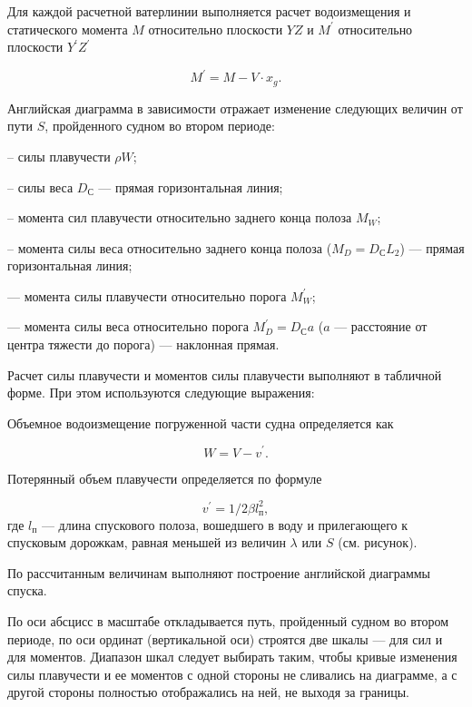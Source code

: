Для каждой расчетной ватерлинии выполняется расчет водоизмещения и статического момента $M$ относительно плоскости $YZ$ и $M^\prime$ относительно плоскости $Y^\prime Z^\prime$

\begin{equation}
    M^\prime = M - V \cdot x_g.
\end{equation}

Английская диаграмма в зависимости отражает изменение следующих величин от пути $S$, пройденного судном во втором периоде:

-- силы плавучести $\rho W$;

-- силы веса $D_{\text{С}}$ --- прямая горизонтальная линия;

-- момента сил плавучести относительно заднего конца полоза $M_W$;

-- момента силы веса относительно заднего конца полоза ($M_D = D_{\text{С}} L_2$) --- прямая горизонтальная линия;

--- момента силы плавучести относительно порога $M_W^\prime$;

--- момента силы веса относительно порога $M_D^\prime = D_{\text{С}} a$ ($a$ --- расстояние от центра тяжести до порога) --- наклонная прямая.

Расчет силы плавучести и моментов силы плавучести выполняют в табличной форме.
При этом используются следующие выражения:

Объемное водоизмещение погруженной части судна определяется как

\begin{equation}
    W = V - v^\prime.
\end{equation}

Потерянный объем плавучести определяется по формуле

\begin{equation}
    v^\prime = 1/2 \beta l_{\text{п}}^2,
\end{equation}
где 
$l_{\text{п}}$ --- длина спускового полоза, вошедшего в воду и прилегающего к спусковым дорожкам, равная меньшей из величин $\lambda$ или $S$ (см. рисунок).


По рассчитанным величинам выполняют построение английской диаграммы спуска.

По оси абсцисс в масштабе откладывается путь, пройденный судном во втором периоде, по оси ординат (вертикальной оси) строятся две шкалы --- для сил и для моментов.
Диапазон шкал следует выбирать таким, чтобы кривые изменения силы плавучести и ее моментов с одной стороны не сливались на диаграмме, а с другой стороны полностью отображались на ней, не выходя за границы.

